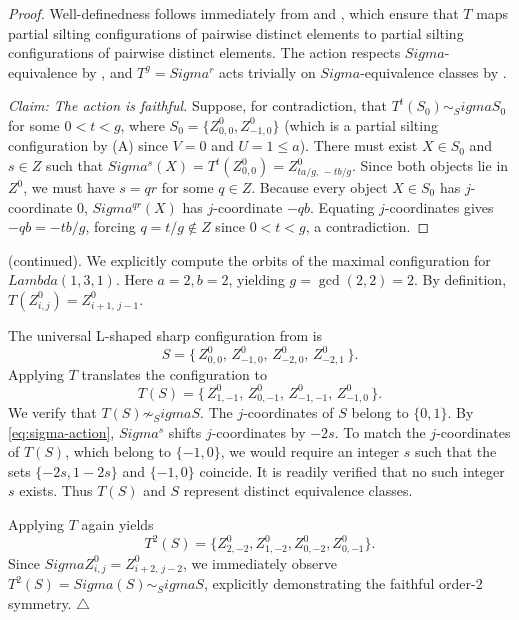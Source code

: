 \documentclass[11pt, a4paper]{article}
\theoremstyle{definition}
\def\Lambda{Lambda}%
\def\Sigma{Sigma}%
\def\mathbb#1{#1}%
\def\mathcal#1{#1}%
\begin{document}
\begin{proof}
Well-definedness follows immediately from  and , which ensure that $T$ maps partial silting configurations of pairwise distinct elements to partial silting configurations of pairwise distinct elements. The action respects $\Sigma$-equivalence by , and $T^g = \Sigma^r$ acts trivially on $\Sigma$-equivalence classes by .

\emph{Claim: The action is faithful.}
Suppose, for contradiction, that $T^t(S_0) \sim_\Sigma S_0$ for some $0 < t < g$, where $S_0 = \{Z_{0,0}^0, Z_{-1,0}^0\}$ (which is a partial silting configuration by (A) since $V = 0$ and $U = 1 \le a$). There must exist $X \in S_0$ and $s \in \mathbb Z$ such that $\Sigma^s(X) = T^t(Z_{0,0}^0) = Z_{ta/g,\, -tb/g}^0$. Since both objects lie in $\mathcal Z^0$, we must have $s = qr$ for some $q \in \mathbb Z$. Because every object $X \in S_0$ has $j$-coordinate $0$, $\Sigma^{qr}(X)$ has $j$-coordinate $-qb$. Equating $j$-coordinates gives $-qb = -tb/g$, forcing $q = t/g \notin \mathbb Z$ since $0 < t < g$, a contradiction.
\end{proof}

 (continued). We explicitly compute the orbits of the maximal configuration for $\Lambda(1,3,1)$. Here $a=2, b=2$, yielding $g = \gcd(2,2) = 2$. By definition, $T(Z_{i,j}^0) = Z_{i+1,\, j-1}^0$.

The universal L-shaped sharp configuration from  is
\[
  S = \bigl\{\, Z_{0,0}^0,\, Z_{-1,0}^0,\, Z_{-2,0}^0,\, Z_{-2,1}^0 \,\bigr\}.
\]
Applying $T$ translates the configuration to
\[
  T(S) = \bigl\{\, Z_{1,-1}^0,\, Z_{0,-1}^0,\, Z_{-1,-1}^0,\, Z_{-1,0}^0 \,\bigr\}.
\]
We verify that $T(S) \not\sim_\Sigma S$. The $j$-coordinates of $S$ belong to $\{0, 1\}$. By \eqref{eq:sigma-action}, $\Sigma^s$ shifts $j$-coordinates by $-2s$. To match the $j$-coordinates of $T(S)$, which belong to $\{-1, 0\}$, we would require an integer $s$ such that the sets $\{-2s, 1-2s\}$ and $\{-1, 0\}$ coincide. It is readily verified that no such integer $s$ exists. Thus $T(S)$ and $S$ represent distinct equivalence classes.

Applying $T$ again yields
\[
  T^2(S) = \{Z_{2,-2}^0, Z_{1,-2}^0, Z_{0,-2}^0, Z_{0,-1}^0\}.
\]
Since $\Sigma Z_{i,j}^0 = Z_{i+2,\, j-2}^0$, we immediately observe $T^2(S) = \Sigma(S) \sim_\Sigma S$, explicitly demonstrating the faithful order-$2$ symmetry. \hfill $\triangle$
\end{document}
